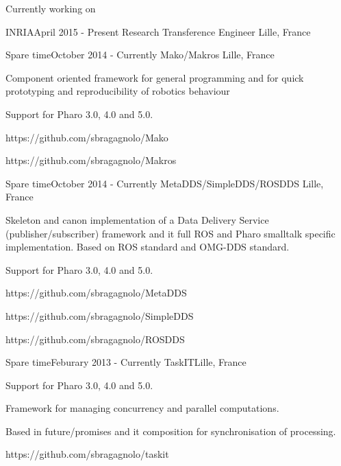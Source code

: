 \documentclass{resume} %
\begin{document}
\begin{rSection}{Currently working on}
\begin{rSubsection}{INRIA}{April 2015 - Present }{ Research Transference Engineer }{Lille, France}
\end{rSubsection}



	\begin{rSubsection}{Spare time}{October 2014 - Currently }{Mako/Makros} {Lille, France}
		\item Component oriented framework for general programming and for  quick prototyping and reproducibility of robotics behaviour
		\item Support for Pharo 3.0, 4.0 and 5.0.
		\item https://github.com/sbragagnolo/Mako
		\item https://github.com/sbragagnolo/Makros
	\end{rSubsection}

	\begin{rSubsection}{Spare time}{October 2014 - Currently }{MetaDDS/SimpleDDS/ROSDDS} {Lille, France}
		\item Skeleton and canon implementation of a Data Delivery Service (publisher/subscriber) framework and it full ROS and Pharo smalltalk specific implementation. Based on ROS standard and OMG-DDS standard.
		\item Support for Pharo 3.0, 4.0 and 5.0.
		\item https://github.com/sbragagnolo/MetaDDS
		\item https://github.com/sbragagnolo/SimpleDDS
		\item https://github.com/sbragagnolo/ROSDDS
	\end{rSubsection}

	\begin{rSubsection}{Spare time}{Feburary 2013 - Currently }{TaskIT}{Lille, France}
		\item Support for Pharo 3.0, 4.0 and 5.0.
		\item Framework for managing concurrency and parallel computations.
		\item Based in future/promises and it composition for synchronisation of processing. 
		\item https://github.com/sbragagnolo/taskit
	\end{rSubsection}
	
\end{rSection}
\end{document}
